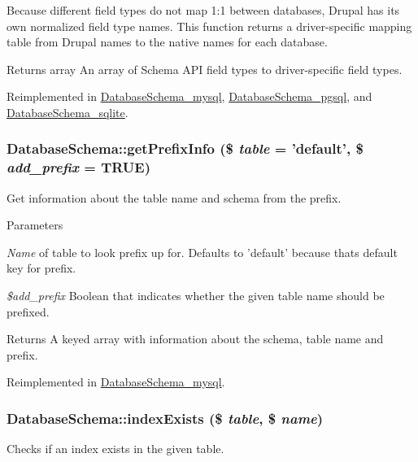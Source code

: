 Because different field types do not map 1:1 between databases, Drupal has its own normalized field type names. This function returns a driver-\/specific mapping table from Drupal names to the native names for each database.

\begin{DoxyReturn}{Returns}
array An array of Schema API field types to driver-\/specific field types. 
\end{DoxyReturn}


Reimplemented in \hyperlink{classDatabaseSchema__mysql_abe6bab05d4dca80ecad5fcd0fb17145e}{DatabaseSchema\_\-mysql}, \hyperlink{classDatabaseSchema__pgsql_a918cab53fb09222d7b017c527bb9534e}{DatabaseSchema\_\-pgsql}, and \hyperlink{classDatabaseSchema__sqlite_a0acdc6880132e45933c71928ca9d0ea7}{DatabaseSchema\_\-sqlite}.\hypertarget{classDatabaseSchema_a8acae6a4bd3e5ba89aaddc8133927ee2}{
\subsubsection[{getPrefixInfo}]{\setlength{\rightskip}{0pt plus 5cm}DatabaseSchema::getPrefixInfo (\$ {\em table} = {\ttfamily 'default'}, \/  \$ {\em add\_\-prefix} = {\ttfamily TRUE})}}
\label{classDatabaseSchema_a8acae6a4bd3e5ba89aaddc8133927ee2}
Get information about the table name and schema from the prefix.


\begin{DoxyParams}{Parameters}
\item[{\em Name}]of table to look prefix up for. Defaults to 'default' because thats default key for prefix. \item[{\em \$add\_\-prefix}]Boolean that indicates whether the given table name should be prefixed.\end{DoxyParams}
\begin{DoxyReturn}{Returns}
A keyed array with information about the schema, table name and prefix. 
\end{DoxyReturn}


Reimplemented in \hyperlink{classDatabaseSchema__mysql_a83aac7da38db04087cd040d93facf5e7}{DatabaseSchema\_\-mysql}.\hypertarget{classDatabaseSchema_ae343d2fd453d51d9df43d439af0a22e2}{
\subsubsection[{indexExists}]{\setlength{\rightskip}{0pt plus 5cm}DatabaseSchema::indexExists (\$ {\em table}, \/  \$ {\em name})}}
\label{classDatabaseSchema_ae343d2fd453d51d9df43d439af0a22e2}
Checks if an index exists in the given table.


